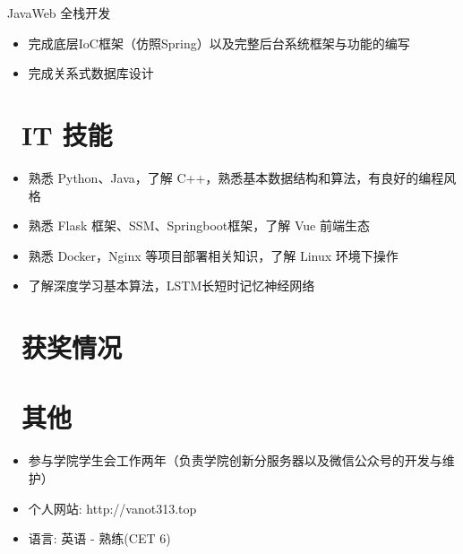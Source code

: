 \documentclass{resume}
\begin{document}
\begin{onehalfspacing}
JavaWeb 全栈开发
\begin{itemize}
  \item 完成底层IoC框架（仿照Spring）以及完整后台系统框架与功能的编写
  \item 完成关系式数据库设计
\end{itemize}
\end{onehalfspacing}


\section{\faCogs\ IT 技能}
\begin{itemize}[parsep=0.5ex]
  \item 熟悉 Python、Java，了解 C++，熟悉基本数据结构和算法，有良好的编程风格
  \item 熟悉 Flask 框架、SSM、Springboot框架，了解 Vue 前端生态
  \item 熟悉 Docker，Nginx 等项目部署相关知识，了解 Linux 环境下操作
  \item 了解深度学习基本算法，LSTM长短时记忆神经网络
\end{itemize}

\section{\faHeartO\ 获奖情况}

\section{\faInfo\ 其他}
\begin{itemize}[parsep=0.5ex]
  \item 参与学院学生会工作两年（负责学院创新分服务器以及微信公众号的开发与维护）
  \item 个人网站: http://vanot313.top
  \item 语言: 英语 - 熟练(CET 6)
\end{itemize}

%
%
\end{document}
